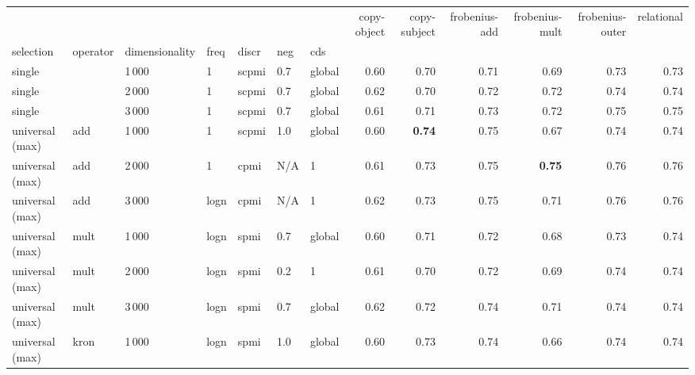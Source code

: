 \begin{tabular}{lllllllrrrrrr}
\toprule
       & {} &      &   &      &     &   &  copy-object &  copy-subject &  frobenius-add &  frobenius-mult &  frobenius-outer &  relational \\
selection & operator & dimensionality & freq & discr & neg & cds &              &               &                &                 &                  &             \\
\midrule
single                 & {}   & 1\,000 & 1     & scpmi & 0.7 & global &         0.60 &          0.70 &           0.71 &            0.69 &             0.73 &        0.73 \\
single                 & {}   & 2\,000 & 1     & scpmi & 0.7 & global &         0.62 &          0.70 &           0.72 &            0.72 &             0.74 &        0.74 \\
single                 & {}   & 3\,000 & 1     & scpmi & 0.7 & global &         0.61 &          0.71 &           0.73 &            0.72 &             0.75 &        0.75 \\ \addlinespace
universal (max)        & add  & 1\,000 & 1     & scpmi & 1.0 & global &         0.60 &          \textbf{0.74} &           0.75 &            0.67 &             0.74 &        0.74 \\
universal (max)        & add  & 2\,000 & 1     & cpmi  & N/A & 1      &         0.61 &          0.73 &           0.75 &            \textbf{0.75} &             0.76 &        0.76 \\
universal (max)        & add  & 3\,000 & logn  & cpmi  & N/A & 1      &         0.62 &          0.73 &           0.75 &            0.71 &             0.76 &        0.76 \\ \addlinespace
universal (max)        & mult & 1\,000 & logn  & spmi  & 0.7 & global &         0.60 &          0.71 &           0.72 &            0.68 &             0.73 &        0.74 \\
universal (max)        & mult & 2\,000 & logn  & spmi  & 0.2 & 1      &         0.61 &          0.70 &           0.72 &            0.69 &             0.74 &        0.74 \\
universal (max)        & mult & 3\,000 & logn  & spmi  & 0.7 & global &         0.62 &          0.72 &           0.74 &            0.71 &             0.74 &        0.74 \\ \addlinespace
universal (max)        & kron & 1\,000 & logn  & spmi  & 1.0 & global &         0.60 &          0.73 &           0.74 &            0.66 &             0.74 &        0.74 \\

\end{tabular}

